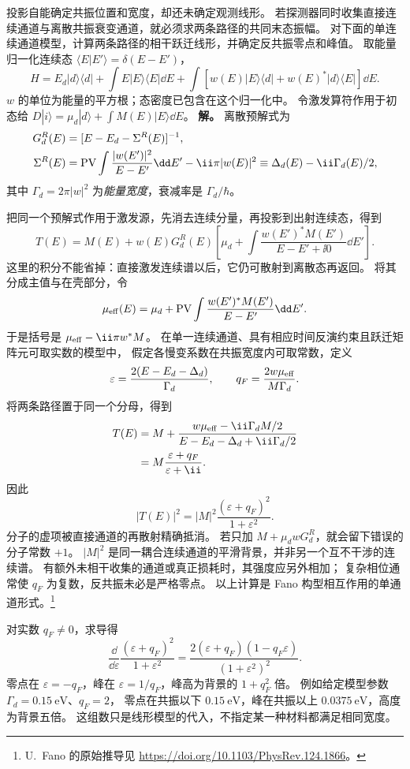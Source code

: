 \begin{exbox}
投影自能确定共振位置和宽度，却还未确定观测线形。
若探测器同时收集直接连续通道与离散共振衰变通道，就必须求两条路径的共同末态振幅。
对下面的单连续通道模型，计算两条路径的相干跃迁线形，并确定反共振零点和峰值。
取能量归一化连续态 $\langle E|E'\rangle=\delta(E-E')$，
\[
H=E_d|d\rangle\langle d|+\int E|E\rangle\langle E|\dd E
+\int[w(E)|E\rangle\langle d|+w(E)^*|d\rangle\langle E|]\dd E.
\]
$w$ 的单位为能量的平方根；态密度已包含在这个归一化中。
令激发算符作用于初态给
$D|i\rangle=\mu_d|d\rangle+\int M(E)|E\rangle\dd E$。
\textbf{解。} 离散预解式为
\begin{align}
G_d^R(E)&=[E-E_d-\Sigma^R(E)]^{-1},
\label{eq:feqo-fano-selfenergy}\\
\Sigma^R(E)&=\mathop{\rm PV}\int\frac{|w(E')|^2}{E-E'}\dd E'
-\ii\pi|w(E)|^2\equiv\Delta_d(E)-\ii\Gamma_d(E)/2,
\label{eq:feqo-fano-width-shift}
\end{align}
其中 $\Gamma_d=2\pi|w|^2$ 为\emph{能量宽度}，衰减率是 $\Gamma_d/\hbar$。

把同一个预解式作用于激发源，先消去连续分量，再投影到出射连续态，得到
\[
T(E)=M(E)+w(E)G_d^R(E)
\left[\mu_d+\int\frac{w(E')^*M(E')}{E-E'+\ii0}\dd E'\right].
\]
这里的积分不能省掉：直接激发连续谱以后，它仍可散射到离散态再返回。
将其分成主值与在壳部分，令
\[
\mu_{\rm eff}(E)=\mu_d+\mathop{\rm PV}\int
\frac{w(E')^*M(E')}{E-E'}\dd E'.
\]
于是括号是 $\mu_{\rm eff}-\ii\pi w^*M$。
在单一连续通道、具有相应时间反演约束且跃迁矩阵元可取实数的模型中，
假定各慢变系数在共振宽度内可取常数，定义
\begin{equation}
\varepsilon=\frac{2(E-E_d-\Delta_d)}{\Gamma_d},
\qquad q_F=\frac{2w\mu_{\rm eff}}{M\Gamma_d}.
\label{eq:feqo-fano-q}
\end{equation}
将两条路径置于同一个分母，得到
\begin{align*}
T(E)&=M+\frac{w\mu_{\rm eff}-\ii\Gamma_dM/2}
{E-E_d-\Delta_d+\ii\Gamma_d/2}\\
&=M\frac{\varepsilon+q_F}{\varepsilon+\ii}.
\end{align*}
因此
\begin{equation}
|T(E)|^2=|M|^2\frac{(\varepsilon+q_F)^2}{1+\varepsilon^2}.
\label{eq:feqo-fano-lineshape}
\end{equation}
分子的虚项被直接通道的再散射精确抵消。
若只加 $M+\mu_dwG_d^R$，就会留下错误的分子常数 $+1$。
$|M|^2$ 是同一耦合连续通道的平滑背景，并非另一个互不干涉的连续谱。
有额外未相干收集的通道或真正损耗时，其强度应另外相加；
复杂相位通常使 $q_F$ 为复数，反共振未必是严格零点。
以上计算是 Fano 构型相互作用的单通道形式。\footnote{U.~Fano 的原始推导见
\url{https://doi.org/10.1103/PhysRev.124.1866}。}

对实数 $q_F\ne0$，求导得
\[
\frac{\dd}{\dd\varepsilon}\frac{(\varepsilon+q_F)^2}{1+\varepsilon^2}
=\frac{2(\varepsilon+q_F)(1-q_F\varepsilon)}{(1+\varepsilon^2)^2}.
\]
零点在 $\varepsilon=-q_F$，峰在 $\varepsilon=1/q_F$，峰高为背景的 $1+q_F^2$ 倍。
例如给定模型参数 $\Gamma_d=\SI{0.15}{\electronvolt}$、$q_F=2$，
零点在共振以下 $\SI{0.15}{\electronvolt}$，峰在共振以上
$\SI{0.0375}{\electronvolt}$，高度为背景五倍。
这组数只是线形模型的代入，不指定某一种材料都满足相同宽度。
\end{exbox}
